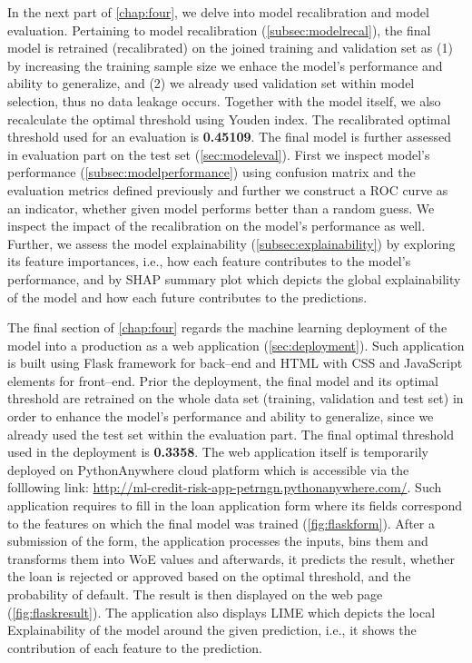 In the next part of \autoref{chap:four}, we delve into model recalibration and model evaluation.
Pertaining to model recalibration (\autoref{subsec:modelrecal}), the final model is retrained (recalibrated) on the joined training and validation set as (1) by increasing the training sample size we enhace the model's performance and ability to generalize, and (2) we already used validation set within model selection, thus no data leakage occurs. Together with the model itself, we also recalculate the optimal threshold using Youden index.
The recalibrated optimal threshold used for an evaluation is \textbf{0.45109}.
The final model is further assessed in evaluation part on the test set (\autoref{sec:modeleval}).
First we inspect model's performance (\autoref{subsec:modelperformance}) using confusion matrix and the evaluation metrics defined previously and further we construct a ROC curve as an indicator, whether given model performs better than a random guess.
We inspect the impact of the recalibration on the model's performance as well.
Further, we assess the model explainability (\autoref{subsec:explainability}) by exploring its feature importances, i.e., how each feature contributes to the model's performance, and by SHAP summary plot which depicts the global explainability of the model and how each future contributes to the predictions.

The final section of \autoref{chap:four} regards the machine learning deployment of the model into a production as a web application (\autoref{sec:deployment}).
Such application is built using Flask framework for back--end and HTML with CSS and JavaScript elements for front--end.
Prior the deployment, the final model and its optimal threshold are retrained on the whole data set (training, validation and test set) in order to enhance the model's performance and ability to generalize, since we already used the test set within the evaluation part. The final optimal threshold used in the deployment is \textbf{0.3358}.
The web application itself is temporarily deployed on PythonAnywhere cloud platform which is accessible via the folllowing link: \url{http://ml-credit-risk-app-petrngn.pythonanywhere.com/}.
Such application requires to fill in the loan application form where its fields correspond to the features on which the final model was trained (\autoref{fig:flaskform}). After a submission of the form, the application processes the inputs, bins them and transforms them into WoE values and afterwards, it predicts the result, whether the loan is rejected or approved based on the optimal threshold, and the probability of default. The result is then displayed on the web page (\autoref{fig:flaskresult}).
The application also displays LIME which depicts the local Explainability of the model around the given prediction, i.e., it shows the contribution of each feature to the prediction.

